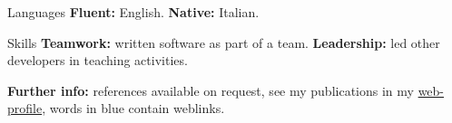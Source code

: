 
\begin{cvskills}

\cvskill
{Languages}
{\textbf{Fluent:} English. \textbf{Native:} Italian.}

\cvskill
{Skills}
{\textbf{Teamwork:} written software as part of a team. \textbf{Leadership:} 
led other developers in teaching activities.}

\end{cvskills}

\vspace{-2mm}
\flushleft
\footnotesize
\item {\color{awesome-red}\textbf{Fur}}{\color{awesome-darknight}\textbf{ther 
info:}} references available on request, see my publications in my 
{\color{myblue}\href{https://www.ncl.ac.uk/engineering/staff/profile/alessandrode-gennaro.html}{web-profile}},
words in {\color{myblue}blue} contain weblinks.